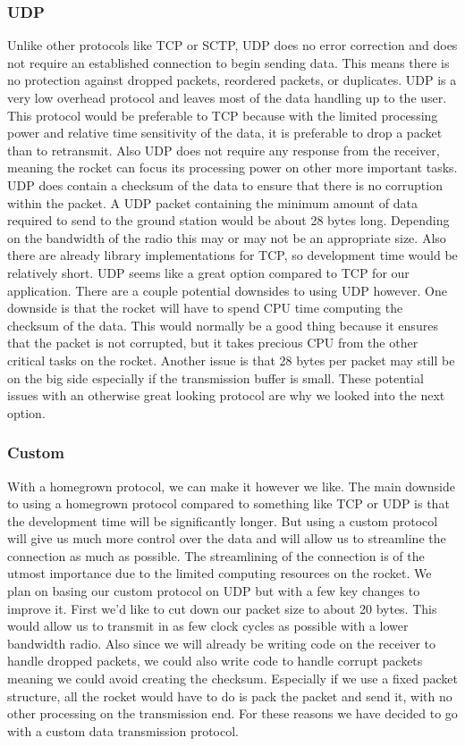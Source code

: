 \documentclass[onecolumn, draftclsnofoot,10pt, compsoc]{IEEEtran}
\begin{document}
\subsubsection{UDP}
Unlike other protocols like TCP or SCTP, UDP does no error correction and does not require an established connection to begin sending data.
This means there is no protection against dropped packets, reordered packets, or duplicates.
UDP is a very low overhead protocol and leaves most of the data handling up to the user.
This protocol would be preferable to TCP because with the limited processing power and relative time sensitivity of the data, it is preferable to drop a packet than to retransmit.
Also UDP does not require any response from the receiver, meaning the rocket can focus its processing power on other more important tasks.
UDP does contain a checksum of the data to ensure that there is no corruption within the packet.
A UDP packet containing the minimum amount of data required to send to the ground station would be about 28 bytes long.
Depending on the bandwidth of the radio this may or may not be an appropriate size.
Also there are already library implementations for TCP, so development time would be relatively short.
UDP seems like a great option compared to TCP for our application.
There are a couple potential downsides to using UDP however.
One downside is that the rocket will have to spend CPU time computing the checksum of the data.
This would normally be a good thing because it ensures that the packet is not corrupted, but it takes precious CPU from the other critical tasks on the rocket.
Another issue is that 28 bytes per packet may still be on the big side especially if the transmission buffer is small.
These potential issues with an otherwise great looking protocol are why we looked into the next option.

\subsubsection{Custom}
With a homegrown protocol, we can make it however we like.
The main downside to using a homegrown protocol compared to something like TCP or UDP is that the development time will be significantly longer.
But using a custom protocol will give us much more control over the data and will allow us to streamline the connection as much as possible.
The streamlining of the connection is of the utmost importance due to the limited computing resources on the rocket.
We plan on basing our custom protocol on UDP but with a few key changes to improve it.
First we'd like to cut down our packet size to about 20 bytes.
This would allow us to transmit in as few clock cycles as possible with a lower bandwidth radio.
Also since we will already be writing code on the receiver to handle dropped packets, we could also write code to handle corrupt packets meaning we could avoid creating the checksum.
Especially if we use a fixed packet structure, all the rocket would have to do is pack the packet and send it, with no other processing on the transmission end.
For these reasons we have decided to go with a custom data transmission protocol.
\end{document}

